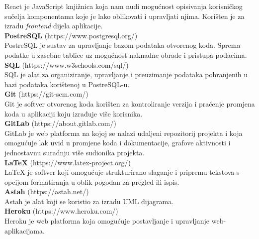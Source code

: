 	{React je JavaScript knjižnica koja nam nudi mogućnost opisivanja korisničkog sučelja komponentama koje je lako oblikovati i upravljati njima. Korišten je za izradu \textit{frontend} dijela aplikacije.\\

			{\textbf{PostreSQL} (https://www.postgresql.org/)}\\

	{PostreSQL je sustav za upravljanje bazom podataka otvorenog koda. Sprema podatke u zasebne tablice uz mogućnost naknadne obrade i pristupa podacima.}\\
			
			{\textbf{SQL} (https://www.w3schools.com/sql/)}\\

	{SQL je alat za organiziranje, upravljanje i preuzimanje podataka pohranjenih u bazi podataka korištenoj u PostreSQL-u.}\\

			{\textbf{Git} (https://git-scm.com/)}\\

	{Git je softver otvorenog koda korišten za kontroliranje verzija i praćenje promjena koda u aplikaciji koju izrađuje više korisnika.}\\

			{\textbf{GitLab} (https://about.gitlab.com/)}\\
	
	{GitLab je web platforma na kojoj se nalazi udaljeni repozitorij projekta i koja omogućuje lak uvid u promjene koda i dokumentacije, grafove aktivnosti i jednostavnu suradnju više sudionika projekta.}\\

			{\textbf{LaTeX} (https://www.latex-project.org/)}\\
	
	{LaTeX je softver koji omogućuje strukturirano slaganje i pripremu tekstova s opcijom formatiranja u oblik pogodan za pregled ili ispis.}\\

			{\textbf{Astah} (https://astah.net/)}\\

	{Astah je alat koji se koristio za izradu UML dijagrama.}\\
	
			{\textbf{Heroku} (https://www.heroku.com/)}\\
	
	{Heroku je web platforma koja omogućuje postavljanje i upravljanje web-aplikacijama.}\\
	
}
